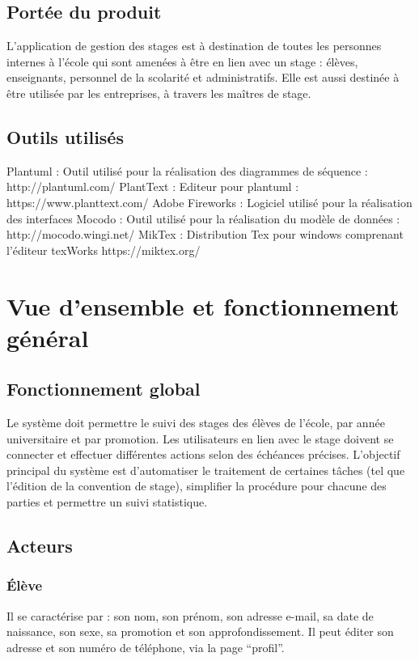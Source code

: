 \documentclass{scrreprt}
\begin{document}
\section{ Portée du produit}
L’application de gestion des stages est à destination de toutes les personnes internes à l’école qui sont amenées à être en lien avec un stage : élèves, enseignants, personnel de la scolarité et administratifs.
Elle est aussi destinée à être utilisée par les entreprises, à travers les maîtres de stage.


\section{Outils utilisés}
Plantuml : Outil utilisé pour la réalisation des diagrammes de séquence : http://plantuml.com/ 
PlantText : Editeur pour plantuml : https://www.planttext.com/
Adobe Fireworks : Logiciel utilisé pour la réalisation des interfaces
Mocodo :  Outil utilisé pour la réalisation du modèle de données : http://mocodo.wingi.net/
MikTex : Distribution Tex pour windows comprenant l’éditeur texWorks https://miktex.org/


\chapter{Vue d'ensemble et fonctionnement g\'en\'eral}

\section{Fonctionnement global}
Le système doit permettre le suivi des stages des élèves de l’école, par année universitaire et par promotion. Les utilisateurs en lien avec le stage doivent se connecter et effectuer différentes actions selon des échéances précises. L’objectif principal du système est d’automatiser le traitement de certaines tâches (tel que l’édition de la convention de stage), simplifier la procédure pour chacune des parties et permettre un suivi statistique.

\section{Acteurs}
\subsection{\'El\`eve}
Il se caract\'erise par : son nom, son pr\'enom, son adresse e-mail, sa date de naissance, son sexe, sa promotion et son approfondissement. Il peut \'editer son adresse et son num\'ero de t\'el\'ephone, via la page “profil”.
\end{document}
